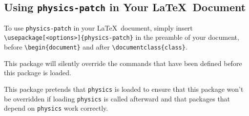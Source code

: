 \documentclass[a4paper,12pt]{article}
\begin{document}
\subsection{Using \texttt{physics-patch} in Your \LaTeX~Document}
To use \texttt{physics-patch} in your \LaTeX~document, simply insert \verb|\usepackage[<options>]{physics-patch}| in the preamble of your document, before \verb|\begin{document}| and after \verb|\documentclass{class}|.

This package will silently override the commands that have been defined before this package is loaded.

This package pretends that \texttt{physics} is loaded to ensure that this package won't be overridden if loading \texttt{physics} is called afterward and that packages that depend on \texttt{physics} work correctly.
\end{document}
